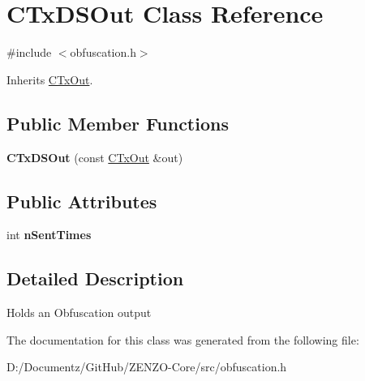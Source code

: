 \hypertarget{class_c_tx_d_s_out}{}\section{C\+Tx\+D\+S\+Out Class Reference}
\label{class_c_tx_d_s_out}


{\ttfamily \#include $<$obfuscation.\+h$>$}



Inherits \mbox{\hyperlink{class_c_tx_out}{C\+Tx\+Out}}.

\subsection*{Public Member Functions}
\begin{DoxyCompactItemize}
\item 
\mbox{\label{class_c_tx_d_s_out_ab48888ca5165eaa165f49d8365f5c53e}} 
{\bfseries C\+Tx\+D\+S\+Out} (const \mbox{\hyperlink{class_c_tx_out}{C\+Tx\+Out}} \&out)
\end{DoxyCompactItemize}
\subsection*{Public Attributes}
\begin{DoxyCompactItemize}
\item 
\mbox{\label{class_c_tx_d_s_out_a6bd3a1e7c7b697062ef4f79699357052}} 
int {\bfseries n\+Sent\+Times}
\end{DoxyCompactItemize}


\subsection{Detailed Description}
Holds an Obfuscation output 

The documentation for this class was generated from the following file\+:\begin{DoxyCompactItemize}
\item 
D\+:/\+Documentz/\+Git\+Hub/\+Z\+E\+N\+Z\+O-\/\+Core/src/obfuscation.\+h\end{DoxyCompactItemize}
